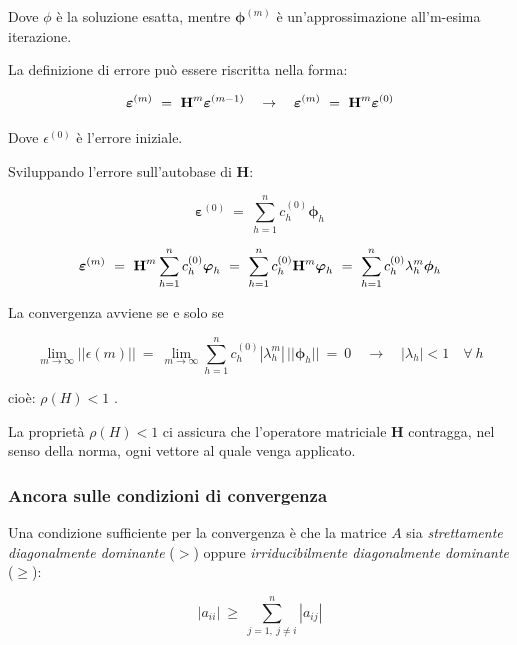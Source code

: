 Dove $\phi$ è la soluzione esatta, mentre $\boldsymbol{\phi}^{(m)}$ è un'approssimazione all'm-esima iterazione.

La definizione di errore può essere riscritta nella forma:

\begin{equation*}
	\boldsymbol{\varepsilon}^{(m)}\ =\ \textbf H^m \boldsymbol{\varepsilon}^{(m-1)}
	\quad \rightarrow \quad
	\boldsymbol{\varepsilon}^{(m)}\ =\ \textbf H^m \boldsymbol{\varepsilon}^{(0)}
\end{equation*}

Dove $\epsilon^{(0)}$ è l'errore iniziale.

Sviluppando l'errore sull'autobase di $\textbf{H}$:

\begin{equation*}
	\boldsymbol{\varepsilon}^{(0)} \ =\ 
	\sum_{h=1}^n c_h^{(0)} \boldsymbol{\phi}_h
\end{equation*}

\begin{equation*}
	\boldsymbol{\varepsilon}^{(m)}\ =\
	\textbf H^m \sum^n_{h=1} c_h^{(0)} \boldsymbol{\varphi}_h\ =\
	\sum^n_{h=1} c^{(0)}_h \mathbf{H}^m \boldsymbol{\varphi}_h\ =\
	\sum_{h=1}^n c_h^{(0)} \lambda_h^m \boldsymbol{\phi}_h
\end{equation*}

La convergenza avviene se e solo se

\begin{equation*}
	\lim_{m\rightarrow\infty} ||\epsilon{(m)}||\ =\ 
	\lim_{m\rightarrow\infty} \sum_{h=1}^n c_h^{(0)} |\lambda_h^m|\, ||\boldsymbol{\phi}_h||\ =\ 0
	\quad \rightarrow \quad
	|\lambda_h| < 1 \quad \forall\ h
\end{equation*}

cioè: $\boxed{\rho(H) < 1}$ .\hfill \square

La proprietà $\rho(H) < 1$ ci assicura che l'operatore matriciale $\mathbf H$ contragga, nel senso della norma, ogni vettore al quale venga applicato.

%
\subsubsection{Ancora sulle condizioni di convergenza}

Una condizione sufficiente per la convergenza è che la matrice $A$ sia \emph{strettamente diagonalmente dominante} ($>$) oppure \emph{irriducibilmente diagonalmente dominante} ($\ge$):

\begin{equation*}
	|a_{ii}|\ \ge\ \sum^n_{j=1,\ j\neq i} |a_{ij}|
\end{equation*}

